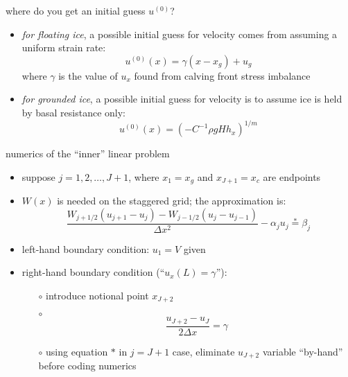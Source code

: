 \begin{frame}{where do you get an initial guess $u^{(0)}$?}

\begin{itemize}
\item \emph{for floating ice}, a possible initial guess for velocity comes from assuming a uniform strain rate:
   $$u^{(0)}(x) = \gamma (x-x_g) + u_g$$
where $\gamma$ is the value of $u_x$ found from calving front stress imbalance
\item \emph{for grounded ice}, a possible initial guess for velocity is to assume ice is held by basal resistance only:
   $$u^{(0)}(x) = \left(-C^{-1} \rho g H h_x\right)^{1/m}$$
\end{itemize}
\end{frame}


\begin{frame}{numerics of the ``inner'' linear problem}

\begin{itemize}
\item suppose $j=1,2,\dots,J+1$, where $x_1 = x_g$ and $x_{J+1} = x_c$ are endpoints
\item $W(x)$ is needed on the staggered grid; the approximation is:
$$\frac{W_{j+1/2} (u_{j+1} - u_j) - W_{j-1/2} (u_{j} - u_{j-1})}{\Delta x^2} - \alpha_j u_j \stackrel{\ast}{=} \beta_j$$
\item left-hand boundary condition: $u_1 = V$ given
\item right-hand boundary condition (``$u_x(L)=\gamma$''):
  \begin{itemize}
  \item[$\circ$] introduce notional point $x_{J+2}$
  \item[$\circ$]
    $$\frac{u_{J+2} - u_J}{2 \Delta x} = \gamma$$
  \item[$\circ$] using equation $\ast$ in $j=J+1$ case, eliminate $u_{J+2}$ variable ``by-hand'' before coding numerics
  \end{itemize}
\end{itemize}
\end{frame}


